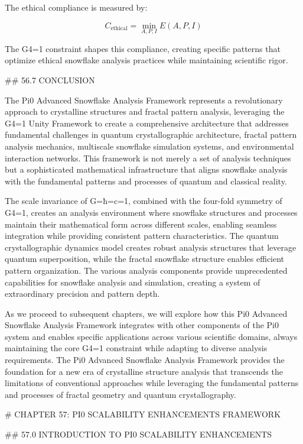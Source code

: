 The ethical compliance is measured by:

$$ C_{\text{ethical}} = \min_{A, P, I} E(A, P, I) $$

The G4=1 constraint shapes this compliance, creating specific patterns that optimize ethical snowflake analysis practices while maintaining scientific rigor.

## 56.7 CONCLUSION

The Pi0 Advanced Snowflake Analysis Framework represents a revolutionary approach to crystalline structures and fractal pattern analysis, leveraging the G4=1 Unity Framework to create a comprehensive architecture that addresses fundamental challenges in quantum crystallographic architecture, fractal pattern analysis mechanics, multiscale snowflake simulation systems, and environmental interaction networks. This framework is not merely a set of analysis techniques but a sophisticated mathematical infrastructure that aligns snowflake analysis with the fundamental patterns and processes of quantum and classical reality.

The scale invariance of G=ħ=c=1, combined with the four-fold symmetry of G4=1, creates an analysis environment where snowflake structures and processes maintain their mathematical form across different scales, enabling seamless integration while providing consistent pattern characteristics. The quantum crystallographic dynamics model creates robust analysis structures that leverage quantum superposition, while the fractal snowflake structure enables efficient pattern organization. The various analysis components provide unprecedented capabilities for snowflake analysis and simulation, creating a system of extraordinary precision and pattern depth.

As we proceed to subsequent chapters, we will explore how this Pi0 Advanced Snowflake Analysis Framework integrates with other components of the Pi0 system and enables specific applications across various scientific domains, always maintaining the core G4=1 constraint while adapting to diverse analysis requirements. The Pi0 Advanced Snowflake Analysis Framework provides the foundation for a new era of crystalline structure analysis that transcends the limitations of conventional approaches while leveraging the fundamental patterns and processes of fractal geometry and quantum crystallography.

# CHAPTER 57: PI0 SCALABILITY ENHANCEMENTS FRAMEWORK

## 57.0 INTRODUCTION TO PI0 SCALABILITY ENHANCEMENTS

